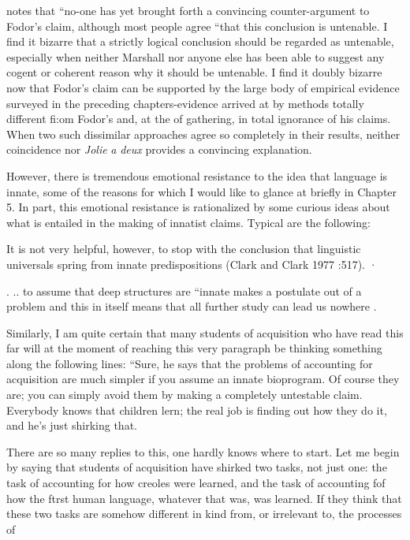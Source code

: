 \citet{Marshall1979} notes that ``no-one has yet brought forth a convincing counter-argument to Fodor's claim, although most people agree ``that this conclusion is untenable. I find it bizarre that a strictly logical conclusion should be regarded as untenable, especially when neither Marshall nor anyone else has been able to suggest any cogent or coherent reason why it should be untenable. I find it doubly bizarre now that Fodor's claim can be supported by the large body of empirical evidence surveyed in the preceding chapters-evidence arrived at by methods totally different fi:om Fodor's and, at the  of gathering, in total ignorance of his claims. When two such dissimilar approaches
agree so completely in their results, neither coincidence nor \textit{Jolie} \textit{a}
\textit{deux} provides a convincing explanation.

However, there is tremendous emotional resistance to the idea that language is innate, some of the reasons for which I would like to glance at briefly in Chapter 5. In part, this emotional resistance is rationalized by some curious ideas about what is entailed in the making of innatist claims. Typical are the following:

It is not very helpful, however, to stop with the conclu\-sion that linguistic universals spring from innate predispositions (Clark and Clark 1977 :517). ·

. .. to assume that deep structures are ``innate makes a postulate out of a problem and this in itself means that all further study can lead us nowhere \citep[383]{Luria1975}.

Similarly, I am quite certain that many students of acquisition who have read this far will at the moment of reaching this very para\-graph be thinking something along the following lines: ``Sure, he says that the problems of accounting for acquisition are much simpler if you assume an innate bioprogram. Of course they are; you can simply avoid them by making a completely untestable claim. Everybody knows that children lern; the real job is finding out how they do it, and he's
just shirking that.


There are so many replies to this, one hardly knows where to start. Let me begin by saying that students of acquisition have shirked
two tasks, not just one: the task of accounting for how creoles were learned, and the task of accounting fof how the ftrst human language, whatever that was, was learned. If they think that these two tasks are somehow different in kind from, or irrelevant to, the processes of

